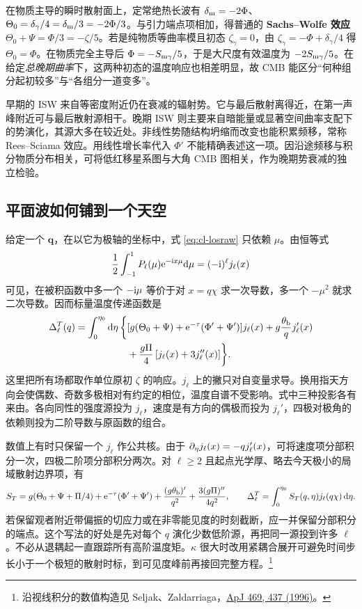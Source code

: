 在物质主导的瞬时散射面上，定常绝热长波有 $\delta_{\rm m}=-2\Phi$、$\Theta_0=\delta_\gamma/4=\delta_{\rm m}/3=-2\Phi/3$。与引力端点项相加，得普通的 \textbf{Sachs--Wolfe 效应} $\Theta_0+\Psi=\Phi/3=-\zeta/5$。若是纯物质等曲率模且初态 $\zeta_\gamma=0$，由 $\zeta_\gamma=-\Phi+\delta_\gamma/4$ 得 $\Theta_0=\Phi$。在物质完全主导后 $\Phi=-S_{\rm m\gamma}/5$，于是大尺度有效温度为 $-2S_{\rm m\gamma}/5$。在给定\emph{总晚期曲率}下，这两种初态的温度响应也相差明显，故 CMB 能区分“何种组分起初较多”与“各组分一道变多”。

早期的 ISW 来自等密度附近仍在衰减的辐射势。它与最后散射离得近，在第一声峰附近可与最后散射源相干。晚期 ISW 则主要来自暗能量或显著空间曲率支配下的势演化，其源大多在较近处。非线性势随结构坍缩而改变也能积累频移，常称 Rees--Sciama 效应。用线性增长率代入 $\Phi'$ 不能精确表述这一项。因沿途频移与积分物质分布相关，可将低红移星系图与大角 CMB 图相关，作为晚期势衰减的独立检验。

\subsection{平面波如何铺到一个天空}

给定一个 $\bm q$，在以它为极轴的坐标中，式 \eqref{eq:cl-losraw} 只依赖 $\mu$。由恒等式
\[
 \frac12\int_{-1}^1P_\ell(\mu)\mathrm{e}^{-\mathrm{i} x\mu}\dd\mu=(-\mathrm{i})^\ell j_\ell(x)
\]
可见，在被积函数中多一个 $-\mathrm{i}\mu$ 等价于对 $x=q\chi$ 求一次导数，多一个 $-\mu^2$ 就求二次导数。因而标量温度传递函数是
\begin{align}
 \Delta_\ell^T(q)=\int_0^{\eta_0}\dd\eta\,\bigg\{&
       [g(\Theta_0+\Psi)+\mathrm{e}^{-\tau}(\Phi'+\Psi')]j_\ell(x)
       +g\frac{\theta_{\rm b}}q j_\ell'(x)\nonumber\\
       &+\frac{g\Pi}{4}\,[j_\ell(x)+3j_\ell''(x)]\bigg\}.
 \label{eq:cl-losT}
\end{align}
这里把所有场都取作单位原初 $\zeta$ 的响应。$j_\ell$ 上的撇只对自变量求导。换用指天方向会使偶数、奇数多极相对有约定的相位，温度自谱不受影响。式中三种投影各有来由。各向同性的强度源投为 $j_\ell$，速度是有方向的偶极而投为 $j_\ell'$，四极对极角的依赖则投为二阶导数与原函数的组合。

数值上有时只保留一个 $j_\ell$ 作公共核。由于 $\partial_\eta j_\ell(x)=-q j_\ell'(x)$，可将速度项分部积分一次，四极二阶项分部积分两次。对 $\ell\ge2$ 且起点光学厚、略去今天极小的局域散射边界项，有
\[
 S_T=g(\Theta_0+\Psi+\Pi/4)+\mathrm{e}^{-\tau}(\Phi'+\Psi')
       +\frac{(g\theta_{\rm b})'}{q^2}
       +\frac{3(g\Pi)''}{4q^2},\qquad
 \Delta_\ell^T=\int_0^{\eta_0}S_T(q,\eta)j_\ell(q\chi)\,\dd\eta .
\]
若保留观者附近带偏振的切应力或在非零能见度的时刻截断，应一并保留分部积分的端点。这个写法的好处是先对每个 $q$ 演化少数低阶源，再把同一源投到许多 $\ell$。不必从退耦起一直跟踪所有高阶温度矩。$\kappa$ 很大时改用紧耦合展开可避免时间步长小于一个极短的散射时标，到可见度峰前再接回完整方程。\footnote{沿视线积分的数值构造见 Seljak、Zaldarriaga，\href{https://doi.org/10.1086/177793}{ApJ 469, 437 (1996)}。}

